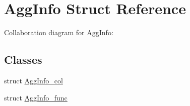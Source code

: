 \hypertarget{struct_agg_info}{\section{Agg\+Info Struct Reference}
\label{struct_agg_info}
}


Collaboration diagram for Agg\+Info\+:
\subsection*{Classes}
\begin{DoxyCompactItemize}
\item 
struct \hyperlink{struct_agg_info_1_1_agg_info__col}{Agg\+Info\+\_\+col}
\item 
struct \hyperlink{struct_agg_info_1_1_agg_info__func}{Agg\+Info\+\_\+func}
\end{DoxyCompactItemize}
